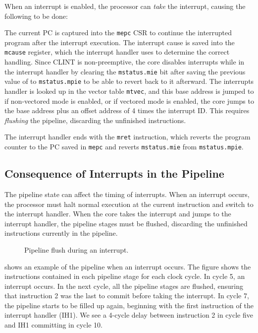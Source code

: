 When an interrupt is enabled, the processor can \textit{take} the interrupt, causing the following to be done:

The current PC is captured into the \lstinline{mepc} CSR to continue the interrupted program after the interrupt execution. 
The interrupt cause is saved into the \lstinline{mcause} register, which the interrupt handler uses to determine the correct handling.
Since CLINT is non-preemptive, the core disables interrupts while in the interrupt handler by clearing the \lstinline{mstatus.mie} bit after saving the previous value of  to \lstinline{mstatus.mpie} to be able to revert back to it afterward. 
The interrupts handler is looked up in the vector table \lstinline{mtvec}, and this base address is jumped to if non-vectored mode is enabled, or if vectored mode is enabled, the core jumps to the base address plus an offset address of 4 times the interrupt ID. This requires \textit{flushing} the pipeline, discarding the unfinished instructions.


The interrupt handler ends with the \lstinline{mret} instruction, which reverts the program counter to the PC saved in \lstinline{mepc} and reverts \lstinline{mstatus.mie} from \lstinline{mstatus.mpie}.

\subsection{Consequence of Interrupts in the Pipeline}

The pipeline state can affect the timing of interrupts. When an interrupt occurs, the processor must halt normal execution at the current instruction and switch to the interrupt handler. When the core takes the interrupt and jumps to the interrupt handler, the pipeline stages must be flushed, discarding the unfinished instructions currently in the pipeline. 


\begin{figure}[htbp]
\centering
\resizebox{0.5\textwidth}{!}{%

}
\caption{Pipeline flush during an interrupt.}
\label{fig:interrupt_flush}
\end{figure}


 shows an example of the pipeline when an interrupt occurs. The figure shows the instructions contained in each pipeline stage for each clock cycle. In cycle 5, an interrupt occurs. In the next cycle, all the pipeline stages are flushed, ensuring that instruction 2 was the last to commit before taking the interrupt. In cycle 7, the pipeline starts to be filled up again, beginning with the first instruction of the interrupt handler (IH1). We see a 4-cycle delay between instruction 2 in cycle five and IH1 committing in cycle 10.

